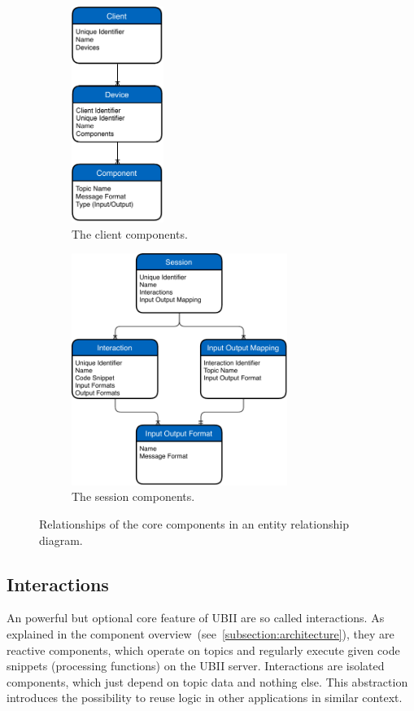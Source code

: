 \begin{figure}[htpb]
  \centering
  \begin{subfigure}{.5\textwidth}
    \centering
    \includegraphics[width=3cm]{figures/ubii_er_client.pdf}
    \caption{The client components.}\label{fig:ubii_er_client}
  \end{subfigure}%
  \begin{subfigure}{.5\textwidth}
    \centering
    \includegraphics[width=7cm]{figures/ubii_er_server.pdf}
    \caption{The session components.}\label{fig:ubii_er_server}
  \end{subfigure}
  \caption[UBII Components Diagram]{Relationships of the core components in an entity relationship diagram.}\label{fig:ubii_er}
\end{figure}


\subsection{Interactions}\label{subsection:interactions}
An powerful but optional core feature of \ac{UBII} are so called interactions. As explained in the component overview~(see~\ref{subsection:architecture}), they are reactive components, which operate on topics and regularly execute given code snippets (processing functions) on the \ac{UBII} server. Interactions are isolated components, which just depend on topic data and nothing else. This abstraction introduces the possibility to reuse logic in other applications in similar context. 

